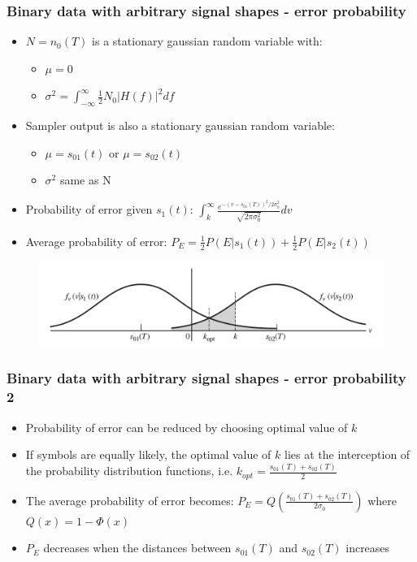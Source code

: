 \documentclass{beamer}
\begin{document}
	\begin{frame}
		\frametitle{Binary data with arbitrary signal shapes - error probability}
		\begin{itemize}
			\item $N = n_0(T)$ is a stationary gaussian random variable with:
			\begin{itemize}
				\item $\mu = 0$
				\item $\sigma^2 = \int_{-\infty}^{\infty} \frac{1}{2}N_0|H(f)|^2 df$
			\end{itemize}
			\item Sampler output is also a stationary gaussian random variable:
			\begin{itemize}
				\item $\mu = s_{01}(t)$ or $\mu = s_{02}(t)$
				\item $\sigma^2$ same as N
			\end{itemize}
			\item Probability of error given $s_1(t)$: $ \int_k^{\infty}{\frac{e^{-(v-s_{01}(T))^2 / 2\sigma_0^2}}{\sqrt{2\pi\sigma_0^2}} dv} $
			\item Average probability of error: $ P_E = \frac{1}{2}P(E|s_1(t)) + \frac{1}{2}P(E|s_2(t)) $
		\end{itemize}
		\begin{figure}
			\includegraphics[width=\textwidth,keepaspectratio,center]{prob_distr.png}
		\end{figure}
	\end{frame}

	\begin{frame}
		\frametitle{Binary data with arbitrary signal shapes - error probability 2}
		\begin{itemize}
			\item Probability of error can be reduced by choosing optimal value of $k$
			\item If symbols are equally likely, the optimal value of $k$ lies at the interception of the probability distribution functions, i.e. $ k_{opt} = \frac{s_{01}(T) + s_{02}(T)}{2} $
			\item The average probability of error becomes: $ P_E = Q(\frac{s_{01}(T) + s_{02}(T)}{2\sigma_0}) $ where $ Q(x) = 1 - \Phi(x) $
			\item $ P_E $ decreases when the distances between $s_{01}(T)$ and $s_{02}(T)$ increases
		\end{itemize}
	\end{frame}
\end{document}
